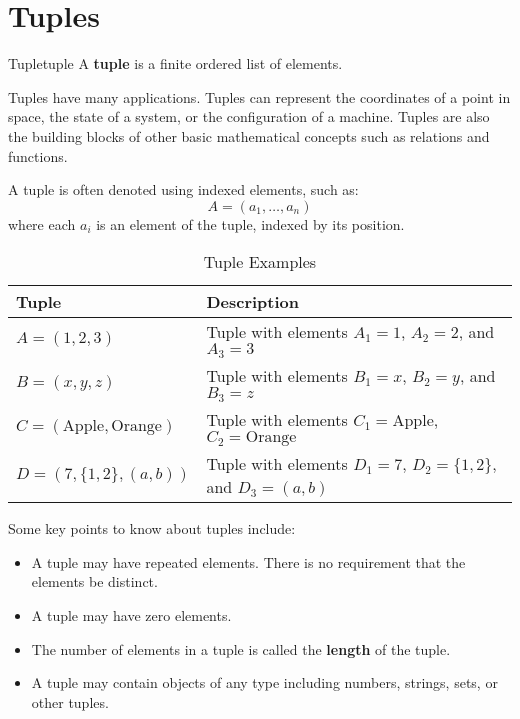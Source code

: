 \section{Tuples}
\begin{definition}{Tuple}{tuple}
  A \textbf{tuple} is a finite ordered list of elements.
\end{definition}

Tuples have many applications. Tuples can represent the coordinates of a point in space,
the state of a system, or the configuration of a machine. Tuples are also the building
blocks of other basic mathematical concepts such as relations and functions.

A tuple is often denoted using indexed elements, such as:
\[
  A = (a_1, \ldots, a_n)
\]
where each \( a_i \) is an element of the tuple, indexed by its position.

\begin{table}[H]
  \centering
  \begin{tabular}{ll}
    \toprule
    \textbf{Tuple} & \textbf{Description} \\
    \midrule
    \( A = (1, 2, 3) \) & Tuple with elements \( A_1 = 1 \), \( A_2 = 2 \), and \( A_3 =3 \) \\
    \( B = (x, y, z) \) & Tuple with elements \( B_1 = x \), \( B_2 = y \), and \( B_3 = z \) \\
    \( C = (\text{Apple}, \text{Orange}) \) & Tuple with elements \( C_1 = \text{Apple} \), \( C_2 = \text{Orange} \) \\
    \( D = (7, \{1, 2\}, (a, b)) \) & Tuple with elements \( D_1 = 7 \), \( D_2 = \{1, 2\} \), and \( D_3 = (a, b) \) \\
    \bottomrule
  \end{tabular}
  \caption{Tuple Examples}
\end{table}

Some key points to know about tuples include:
\begin{itemize}
  \item A tuple may have repeated elements. There is no requirement that the elements be distinct.
  \item A tuple may have zero elements.
  \item The number of elements in a tuple is called the \textbf{length} of the tuple.
  \item A tuple may contain objects of any type including numbers, strings, sets, or other tuples.
\end{itemize}

